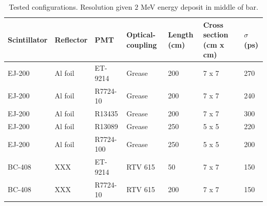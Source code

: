 \documentclass[review]{elsarticle}
\begin{document}
\begin{table}[t!]
	\caption{Tested configurations. Resolution given $2$ \si{\mega\electronvolt} energy deposit in middle of bar.}
	\begin{tabular}{  m{5em} | m{4em} | m{5em} | m{4em} | m{3em} |  m{5.7em} | m{3em} }
		\hline
			Scintillator & Reflector & PMT & Optical-coupling & Length (cm) & Cross section (\si{\centi\meter} x \si{\centi\meter}) & $\sigma$ (\si{\pico\second})\\
		\hline
		\hline
			EJ-200 & Al foil & ET-9214 & Grease & 200 & 7 x 7 & 270			\\
		
			EJ-200 & Al foil & R7724-10 & Grease & 200 & 7 x 7 & 240		\\
			EJ-200 & Al foil & R13435 & Grease & 200 & 7 x 7 & 300 			\\
		
			EJ-200 & Al foil & R13089 & Grease & 250 & 5 x 5  & 220			\\
			EJ-200 & Al foil & R7724-100 & Grease & 250 & 5 x 5 & 200 		\\
			
			BC-408 & XXX & ET-9214 & RTV 615 &50 & 7 x 7 & 150				\\
			BC-408 & XXX & R7724-10 & RTV 615 & 200 & 7 x 7 & 150			\\
		\hline
	\end{tabular}
	\label{tab:tests}
\end{table}
\end{document}
